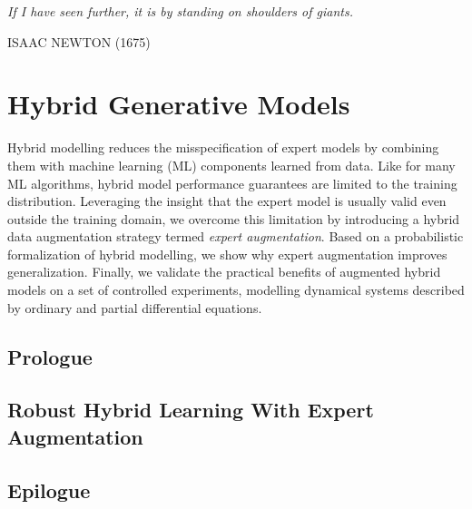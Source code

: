 \null\vfill

{\centering
\parbox{\textwidth}{%
  \raggedright{\huge\itshape%
   If I have seen further, it is by standing on shoulders of giants.\par\bigskip
  }
  \raggedleft\Large\MakeUppercase{Isaac Newton (1675)}\par%
}}

\vfill\vfill

\chapter{Hybrid Generative Models}\label{ch:07}

\begin{chapter_outline}

Hybrid modelling reduces the misspecification of expert models by combining them with machine learning (ML) components learned from data. Like for many ML algorithms, hybrid model performance guarantees are limited to the training distribution. Leveraging the insight that the expert model is usually valid even outside the training domain, we overcome this limitation by introducing a hybrid data augmentation strategy termed \textit{expert augmentation}. Based on a probabilistic formalization of hybrid modelling, we show why expert augmentation improves generalization. Finally, we validate the practical benefits of augmented hybrid models on a set of controlled experiments, modelling dynamical systems described by ordinary and partial differential equations.

\end{chapter_outline}

\section{Prologue}

\section{Robust Hybrid Learning With Expert Augmentation}


\section{Epilogue}
